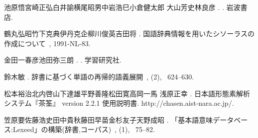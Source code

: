 \documentclass[japanese]{jnlp_1.4}
\begin{document}
\begin{thebibliography}{}
池原悟\JBA 宮崎正弘\JBA 白井諭\JBA 横尾昭男\JBA 中岩浩巳\JBA 小倉健太郎\JBA
  大山芳史\JBA 林良彦 \BBCP.
\newblock {}.
\newblock 岩波書店.

鶴丸弘昭\JBA 竹下克典\JBA 伊丹克企\JBA 柳川俊英\JBA 吉田将 \BBCP.
\newblock \JBOQ 国語辞典情報を用いたシソーラスの作成について\JBCQ\
\newblock {}, {\Bbf \textmd{1991-NL-}83}.

金田一春彦\JBA 池田弥三朗 \BBCP.
\newblock {}.
\newblock 学習研究社.

鈴木敏 \BBCP.
\newblock \JBOQ 辞書に基づく単語の再帰的語義展開\JBCQ\
\newblock {}, {}  (2), \mbox{\BPGS\ 624--630}.

松本裕治\JBA 北内啓\JBA 山下達雄\JBA 平野善隆\JBA 松田寛\JBA 高岡一馬\JBA
  浅原正幸 \BBOP 2000\BBCP.
\newblock \JBOQ 日本語形態素解析システム『茶筌』 version 2.2.1 使用説明書\JBCQ.
\newblock http://chasen.aist-nara.ac.jp/.

笠原要\JBA 佐藤浩史\JBA 田中貴秋\JBA 藤田早苗\JBA 金杉友子\JBA 天野成昭 \BBOP
  2004\BBCP.
\newblock \JBOQ 「基本語意味データベース:Lexeed」の構築(辞書,コーパス)\JBCQ\
\newblock {}, {}  (1),
  \mbox{\BPGS\ 75--82}.

\end{thebibliography}

\begin{biography}

\end{biography}


\biodate
\end{document}
